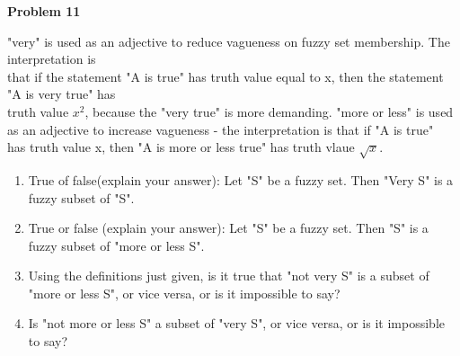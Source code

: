 \documentclass{article}
\begin{document}
\newpage
\noindent \textbf{Problem 11}

\noindent "very" is used as an adjective to reduce vagueness on fuzzy set membership. The interpretation is \\ that if the statement "A is true" has truth value equal to x, then the statement 
"A is very true" has \\ truth value $x^2$, because the "very true" is more demanding. \newline "more or less" is used as an adjective to increase vagueness - the interpretation is that if
"A is true" \\ has truth value x, then "A is more or less true" has truth vlaue $\sqrt{x}$.
\begin{enumerate}
  \item True of false(explain your answer): Let "S" be a fuzzy set. Then "Very S" is a fuzzy subset of "S".
  \item True or false (explain your answer): Let "S" be a fuzzy set. Then "S" is a fuzzy subset of "more or less S".
  \item Using the definitions just given, is it true that "not very S" is a subset of "more or less S", or vice versa, or is it impossible to say?
  \item Is "not more or less S" a subset of "very S", or vice versa, or is it impossible to say? \\ \\
\end{enumerate}
\end{document}
